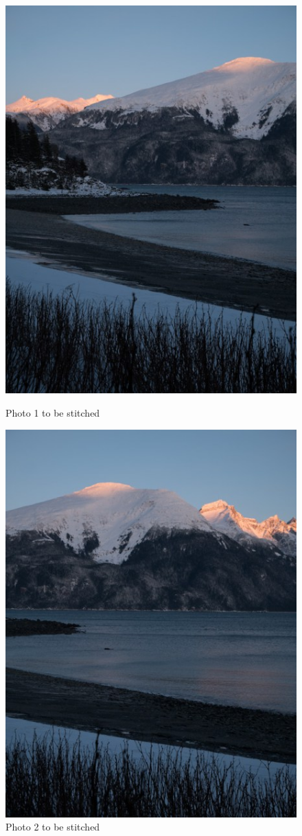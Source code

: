 \documentclass{exam}
\begin{document}
\begin{questions}
\begin{figure}[H]
   \begin{minipage}{0.48\textwidth}
     \centering
     \includegraphics[width=0.8\linewidth]{landscape_1.jpg}
     \caption{Photo 1 to be stitched}\label{Fig:Data1}
   \end{minipage}\hfill
   \begin{minipage}{0.48\textwidth}
     \centering
     \includegraphics[width=0.8\linewidth]{landscape_2.jpg}
     \caption{Photo 2 to be stitched}\label{Fig:Data2}
   \end{minipage}
\end{figure}


\end{questions}
\end{document}
